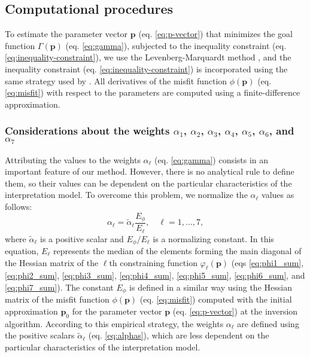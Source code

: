 \subsection{Computational procedures}

To estimate the parameter vector $\mathbf{p}$ (eq. \ref{eq:p-vector}) that minimizes the goal function $\Gamma(\mathbf{p})$ (eq. \ref{eq:gamma}), subjected to the inequality constraint (eq. \ref{eq:inequality-constraint}), we use the Levenberg-Marquardt method \cite[ p. 240]{aster-etal2019}, and the inequality constraint (eq. \ref{eq:inequality-constraint}) is incorporated using the same strategy used by \cite{barbosa-1999b}. All derivatives of the misfit function $\phi(\mathbf{p})$ (eq. \ref{eq:misfit}) with respect to the parameters are computed using a finite-difference approximation.

\subsubsection{Considerations about the weights $\alpha_1$, $\alpha_2$, $\alpha_3$, $\alpha_4$, $\alpha_5$, $\alpha_6$, and $\alpha_7$}

Attributing the values to the weights $ \alpha_{\ell} $ (eq. \ref{eq:gamma}) consists in an important feature of our method. However, there is no analytical rule to define them, so their values can be dependent on the particular characteristics of the interpretation model. To overcome this problem, we normalize the $ \alpha_{\ell} $ values as follows:
\begin{equation}\label{eq:alphas}
\alpha_{\ell} = \tilde{\alpha}_\ell\frac{E_\phi}{E_\ell}, \quad \ell = 1,\dots, 7,
\end{equation}
where $\tilde{\alpha}_\ell$ is a positive scalar and $ E_\phi/E_\ell $ is a normalizing constant. In this equation, $ E_\ell $ represents the median of the elements forming the main diagonal of the Hessian matrix of the $\ell$th constraining function $\varphi_{\ell}(\mathbf{p})$ (eqs \ref{eq:phi1_sum}, \ref{eq:phi2_sum}, \ref{eq:phi3_sum}, \ref{eq:phi4_sum}, \ref{eq:phi5_sum}, \ref{eq:phi6_sum}, and \ref{eq:phi7_sum}). The constant $E_\phi$ is defined in a similar way using the Hessian matrix of the misfit function $\phi(\mathbf{p})$ (eq. \ref{eq:misfit}) computed with the initial approximation $ \mathbf{p}_0 $ for the parameter vector $ \mathbf{p} $ (eq. \ref{eq:p-vector}) at the inversion algorithm. According to this empirical strategy, the weights $ \alpha_{\ell} $ are defined using the positive scalars $\tilde{\alpha}_\ell$ (eq. \ref{eq:alphas}), which are less dependent on the particular characteristics of the interpretation model.

